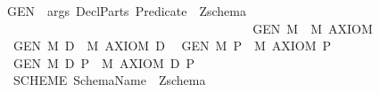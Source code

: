 \begin{isabellebody}
\ {\isachardoublequoteopen}{\isacharunderscore}GEN{}{\isachardoublequoteclose}\ {\isacharcolon}{\isacharcolon}\ {\isachardoublequoteopen}{\isacharbrackleft}args{\isacharcomma}\ DeclParts{\isacharcomma}\ Predicate{\isacharbrackright}\ {\isacharequal}{\isachargreater}\ Zschema{\isachardoublequoteclose}\ \isanewline
\ \ \ \ \ \ \ \ \ \ \ \ \ \ \ \ \ \ \ \ \ \ \ \ \ \ \ \ \ \ \ \ {\isacharparenleft}{\isachardoublequoteopen}{\isacharplus}{\isacharequal}{\isacharequal}\ {\isacharbrackleft}{\isacharparenleft}{\isacharunderscore}{\isacharparenright}{\isacharbrackright}\ {\isacharequal}{\isacharequal}{\isacharequal}{\isacharslash}{\isacharslash}{\isacharparenleft}{}\ {\isacharunderscore}{\isacharparenright}{\isacharslash}{\isacharslash}{\isacharbar}{\isacharminus}{\isacharminus}{\isacharslash}{\isacharslash}{\isacharparenleft}{}\ {\isacharunderscore}{\isacharparenright}{\isacharslash}{\isacharslash}{\isacharminus}{\isacharequal}{\isacharequal}{\isachardoublequoteclose}{\isacharparenright}\isanewline
\ \isanewline
\isanewline
{}\isamarkupfalse%
\isanewline
\isanewline
\ \ {\isachardoublequoteopen}{\isacharunderscore}GEN{}\ M{\isachardoublequoteclose}\ {\isacharequal}{\isacharequal}\ {\isachardoublequoteopen}{\isacharpercent}M{\isachardot}\ {\isacharparenleft}{\isacharunderscore}AXIOM{}{\isacharparenright}{\isachardoublequoteclose}\ \isanewline
\ \ {\isachardoublequoteopen}{\isacharunderscore}GEN{}\ M\ D{\isachardoublequoteclose}\ {\isacharequal}{\isacharequal}\ {\isachardoublequoteopen}{\isacharpercent}M{\isachardot}\ {\isacharparenleft}{\isacharunderscore}AXIOM{}\ D{\isacharparenright}{\isachardoublequoteclose}\isanewline
\ \ {\isachardoublequoteopen}{\isacharunderscore}GEN{}\ M\ P{\isachardoublequoteclose}\ {\isacharequal}{\isacharequal}\ {\isachardoublequoteopen}{\isacharpercent}M{\isachardot}\ {\isacharparenleft}{\isacharunderscore}AXIOM{}\ P{\isacharparenright}{\isachardoublequoteclose}\ \isanewline
\ \ {\isachardoublequoteopen}{\isacharunderscore}GEN{}\ M\ D\ P{\isachardoublequoteclose}\ {\isacharequal}{\isacharequal}\ {\isachardoublequoteopen}{\isacharpercent}M{\isachardot}\ {\isacharparenleft}{\isacharunderscore}AXIOM{}\ D\ P{\isacharparenright}{\isachardoublequoteclose}\isanewline
\isanewline
\isanewline
{}\isamarkupfalse%
\isanewline
\ \ {\isachardoublequoteopen}{\isacharunderscore}SCHEME{}{\isachardoublequoteclose}{\isacharcolon}{\isacharcolon}\ {\isachardoublequoteopen}SchemaName\ {\isacharequal}{\isachargreater}\ Zschema{\isachardoublequoteclose}\ \ \ \ \ \ \ \ \ \ \ \ \ \ \ \ \ \ \ \ {\isacharparenleft}{\isachardoublequoteopen}{\isacharplus}{\isacharminus}{\isacharminus}\ {\isacharunderscore}\ {\isacharminus}{\isacharminus}{\isacharminus}\ {\isacharslash}{\isacharslash}{\isacharminus}{\isacharminus}{\isacharminus}{\isachardoublequoteclose}\ {\isacharparenright}\ \isanewline

\end{isabellebody}
